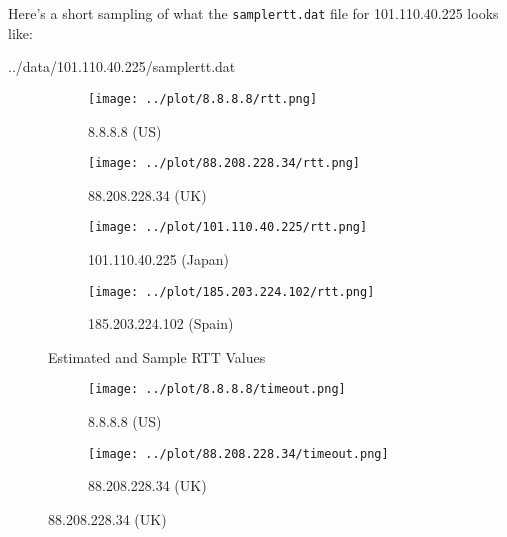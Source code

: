 \documentclass[11pt]{article}
\begin{document}
  Here's a short sampling of what the \texttt{samplertt.dat} file for 101.110.40.225 looks like:
  
  {../data/101.110.40.225/samplertt.dat} %

  \begin{landscape}
    \begin{figure}[H]
      \centering

      \begin{subfigure}[t]{.675\textwidth}
        \centering
        \texttt{[image: ../plot/8.8.8.8/rtt.png]}
        \caption{8.8.8.8 (US)}
        \label{fig:usartt}
      \end{subfigure}
      \hfill
      \begin{subfigure}[t]{.675\textwidth}
        \centering
        \texttt{[image: ../plot/88.208.228.34/rtt.png]}
        \caption{88.208.228.34 (UK)}
      \end{subfigure}

      \medskip

      \begin{subfigure}[t]{.675\textwidth}
        \centering
        \texttt{[image: ../plot/101.110.40.225/rtt.png]}
        \caption{101.110.40.225 (Japan)}
      \end{subfigure}
      \hfill
      \begin{subfigure}[t]{.675\textwidth}
        \centering
        \texttt{[image: ../plot/185.203.224.102/rtt.png]}
        \caption{185.203.224.102 (Spain)}
      \end{subfigure}

      \caption{Estimated and Sample RTT Values}
      \label{fig:rtt}
    \end{figure}

    \begin{figure}[H]
      \centering

      \begin{subfigure}[t]{.675\textwidth}
        \centering
        \texttt{[image: ../plot/8.8.8.8/timeout.png]}
        \caption{8.8.8.8 (US)}
      \end{subfigure}
      \hfill
      \begin{subfigure}[t]{.675\textwidth}
        \centering
        \texttt{[image: ../plot/88.208.228.34/timeout.png]}
        \caption{88.208.228.34 (UK)}
      \end{subfigure}


\end{figure}
\end{landscape}
\end{document}
